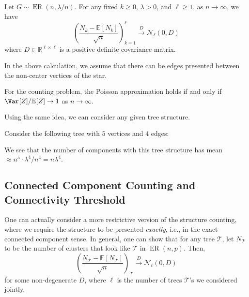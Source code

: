 \begin{theorem}
	Let \(G \sim \operatorname{ER}(n, \lambda / n) \). For any fixed \(k \geq 0\), \(\lambda > 0\), and \(\ell \geq 1\), as \(n \to \infty \), we have
	\[
		\left( \frac{N_k - \mathbb{E}_{}[N_k] }{\sqrt{n} } \right) _{k=1}^{\ell }
		\overset{D}{\to} \mathcal{N} _\ell (0, D)
	\]
	where \(D \in \mathbb{R} ^{\ell \times \ell }\) is a positive definite covariance matrix.
\end{theorem}

\begin{note}
	In the above calculation, we assume that there can be edges presented between the non-center vertices of the star.
\end{note}

\begin{remark}
	For the counting problem, the Poisson approximation holds if and only if \(\Var_{}[Z] / \mathbb{E}_{}[Z] \to 1\) as \(n \to \infty \).
\end{remark}

Using the same idea, we can consider any given tree structure.

\begin{intuition}
	Consider the following tree with \(5\) vertices and \(4\) edges:
	\begin{center}
	\end{center}
	We see that the number of components with this tree structure has mean \(\approx n^5 \cdot \lambda ^4 / n^4 = n \lambda ^4\).
\end{intuition}

\subsection{Connected Component Counting and Connectivity Threshold}
One can actually consider a more restrictive version of the structure counting, where we require the structure to be presented \emph{exactly}, i.e., in the exact connected component sense. In general, one can show that for any tree \(\mathcal{T} \), let \(N_{\mathcal{T} } \) to be the number of clusters that look like \(\mathcal{T} \) in \(\operatorname{ER}(n, p) \). Then,
\[
	\left( \frac{N_{\mathcal{T} } - \mathbb{E}_{}[N_{\mathcal{T} }] }{\sqrt{n} } \right) _{\mathcal{T} }
	\overset{D}{\to} \mathcal{N} _\ell (0, D)
\]
for some non-degenerate \(D\), where \(\ell \) is the number of trees \(\mathcal{T} \)'s we considered jointly.


